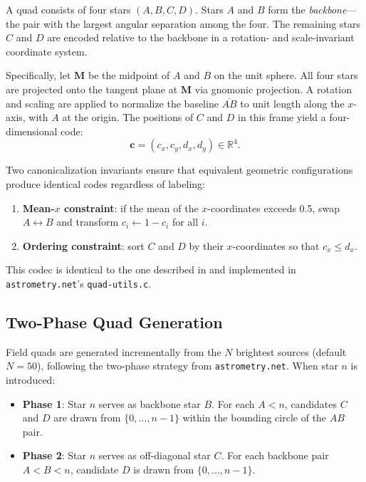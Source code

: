 \documentclass[twocolumn, 10pt]{article}
\begin{document}
A quad consists of four stars $(A, B, C, D)$. Stars $A$ and $B$ form the
\emph{backbone}---the pair with the largest angular separation among the
four. The remaining stars $C$ and $D$ are encoded relative to the backbone
in a rotation- and scale-invariant coordinate system.

Specifically, let $\mathbf{M}$ be the midpoint of $A$ and $B$ on the unit
sphere. All four stars are projected onto the tangent plane at $\mathbf{M}$
via gnomonic projection. A rotation and scaling are applied to normalize
the baseline $\overline{AB}$ to unit length along the $x$-axis, with $A$
at the origin. The positions of $C$ and $D$ in this frame yield a
four-dimensional code:
\begin{equation} \label{eq:code}
    \mathbf{c} = (c_x, c_y, d_x, d_y) \in \mathbb{R}^4.
\end{equation}

Two canonicalization invariants ensure that equivalent geometric
configurations produce identical codes regardless of labeling:
\begin{enumerate}
    \item \textbf{Mean-$x$ constraint}: if the mean of the $x$-coordinates
          exceeds 0.5, swap $A \leftrightarrow B$ and transform
          $c_i \leftarrow 1 - c_i$ for all $i$.
    \item \textbf{Ordering constraint}: sort $C$ and $D$ by their
          $x$-coordinates so that $c_x \leq d_x$.
\end{enumerate}

This codec is identical to the one described in \citet{lang2010} and
implemented in \texttt{astrometry.net}'s \texttt{quad-utils.c}.

\subsection{Two-Phase Quad Generation} \label{sec:twophase}

Field quads are generated incrementally from the $N$ brightest sources
(default $N=50$), following the two-phase strategy from
\texttt{astrometry.net}. When star $n$ is introduced:

\begin{itemize}
    \item \textbf{Phase 1}: Star $n$ serves as backbone star $B$. For each
          $A < n$, candidates $C$ and $D$ are drawn from $\{0, \ldots, n-1\}$
          within the bounding circle of the $AB$ pair.
    \item \textbf{Phase 2}: Star $n$ serves as off-diagonal star $C$. For
          each backbone pair $A < B < n$, candidate $D$ is drawn from
          $\{0, \ldots, n-1\}$.
\end{itemize}
\end{document}
